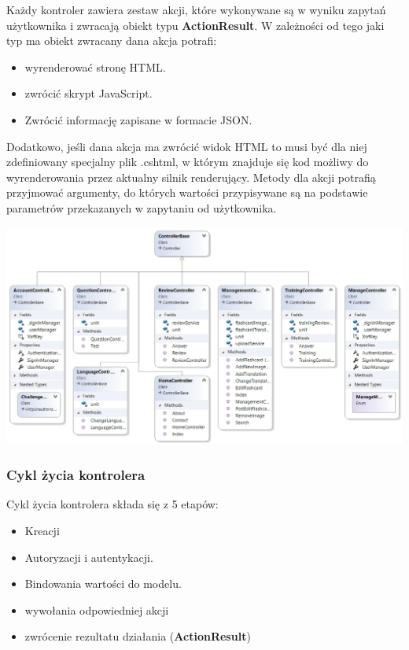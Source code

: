 Każdy kontroler zawiera zestaw akcji, które wykonywane są w wyniku zapytań użytkownika i zwracają obiekt typu \textbf{ActionResult}. W zależności od tego jaki typ ma obiekt zwracany dana akcja potrafi:

\begin{itemize}
	\item wyrenderować stronę HTML.
	\item zwrócić skrypt JavaScript.
	\item Zwrócić informację zapisane w formacie JSON.
\end{itemize}

Dodatkowo, jeśli dana akcja ma zwrócić widok HTML to musi być dla niej zdefiniowany specjalny plik .cshtml, w którym znajduje się kod możliwy do wyrenderowania przez aktualny silnik renderujący. 
Metody dla akcji potrafią przyjmować argumenty, do których wartości przypisywane są na podstawie parametrów przekazanych w zapytaniu od użytkownika. 
\begin{landscape}
\begin{center}
	\includegraphics[width=\paperwidth]{images/Controllers.png}
\end{center}
\end{landscape}

\subsubsection{Cykl życia kontrolera}

Cykl życia kontrolera składa się z 5 etapów:
\begin{itemize}
	\item Kreacji
	\item Autoryzacji i autentykacji.
	\item Bindowania wartości do modelu.
	\item wywołania odpowiedniej akcji
	\item zwrócenie rezultatu działania (\textbf{ActionResult})
\end{itemize}

